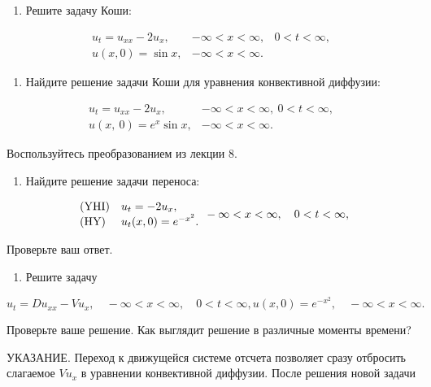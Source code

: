 \documentclass[
  ukrainian,
]{article}
\providecommand{\tightlist}{%
  \setlength{\itemsep}{0pt}\setlength{\parskip}{0pt}}
\begin{document}
\begin{enumerate}
\def\labelenumi{\arabic{enumi}.}
\tightlist
\item
  Решите задачу Коши:
\end{enumerate}

\[
\begin{array}{ll} u_t = u_{xx} - 2u_x, & -\infty < x < \infty, & 0 < t < \infty, \\ u(x, 0) = \sin x, & -\infty < x < \infty. \end{array}
\]

\begin{enumerate}
\def\labelenumi{\arabic{enumi}.}
\setcounter{enumi}{1}
\tightlist
\item
  Найдите решение задачи Коши для уравнения конвективной диффузии:
\end{enumerate}

\[
\begin{array}{ll} u_t = u_{xx} - 2u_x, & -\infty < x < \infty, \ 0 < t < \infty, \\ u(x, \ 0) = e^x \sin x, & -\infty < x < \infty. \end{array}
\]

Воспользуйтесь преобразованием из лекции 8.

\begin{enumerate}
\def\labelenumi{\arabic{enumi}.}
\setcounter{enumi}{2}
\tightlist
\item
  Найдите решение задачи переноса:
\end{enumerate}

\[
\begin{array}{ll} (\text{YHI}) & u_t = -2u_x, \\ (\text{HY}) & u_t(x, 0) = e^{-x^2}. \end{array} \\ -\infty < x < \infty, \quad 0 < t < \infty,
\]

Проверьте ваш ответ.

\begin{enumerate}
\def\labelenumi{\arabic{enumi}.}
\setcounter{enumi}{3}
\tightlist
\item
  Решите задачу
\end{enumerate}

\[
u_t = Du_{xx} - Vu_x, \quad -\infty < x < \infty, \quad 0 < t < \infty,
u(x, 0) = e^{-x^2}, \quad -\infty < x < \infty.
\]

Проверьте ваше решение. Как выглядит решение в различные моменты
времени?

УКАЗАНИЕ. Переход к движущейся системе отсчета позволяет сразу отбросить
слагаемое \(Vu_x\) в уравнении конвективной диффузии. После решения
новой задачи
\end{document}

